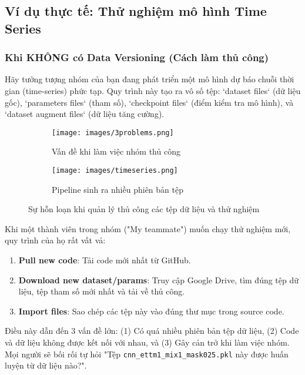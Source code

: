 \documentclass[11pt]{article}
\begin{document}
\subsection{Ví dụ thực tế: Thử nghiệm mô hình Time Series}

\subsubsection{Khi KHÔNG có Data Versioning (Cách làm thủ công)}
Hãy tưởng tượng nhóm của bạn đang phát triển một mô hình dự báo chuỗi thời gian (time-series) phức tạp. Quy trình này tạo ra vô số tệp: `dataset files` (dữ liệu gốc), `parameters files` (tham số), `checkpoint files` (điểm kiểm tra mô hình), và `dataset augment files` (dữ liệu tăng cường).

\begin{figure}[H]
    \centering
    \begin{subfigure}{0.48\textwidth}
        \texttt{[image: images/3problems.png]}
        \caption{Vấn đề khi làm việc nhóm thủ công}
    \end{subfigure}
    \hfill
    \begin{subfigure}{0.48\textwidth}
        \texttt{[image: images/timeseries.png]}
        \caption{Pipeline sinh ra nhiều phiên bản tệp}
    \end{subfigure}
    \caption{Sự hỗn loạn khi quản lý thủ công các tệp dữ liệu và thử nghiệm}
\end{figure}

Khi một thành viên trong nhóm ("My teammate") muốn chạy thử nghiệm mới, quy trình của họ rất vất vả:
\begin{enumerate}
    \item \textbf{Pull new code}: Tải code mới nhất từ GitHub.
    \item \textbf{Download new dataset/params}: Truy cập Google Drive, tìm đúng tệp dữ liệu, tệp tham số mới nhất và tải về thủ công.
    \item \textbf{Import files}: Sao chép các tệp này vào đúng thư mục trong source code.
\end{enumerate}
Điều này dẫn đến 3 vấn đề lớn: (1) Có quá nhiều phiên bản tệp dữ liệu, (2) Code và dữ liệu không được kết nối với nhau, và (3) Gây cản trở khi làm việc nhóm. Mọi người sẽ bối rối tự hỏi "Tệp \texttt{cnn\_ettm1\_mix1\_mask025.pkl} này được huấn luyện từ dữ liệu nào?".
\end{document}
